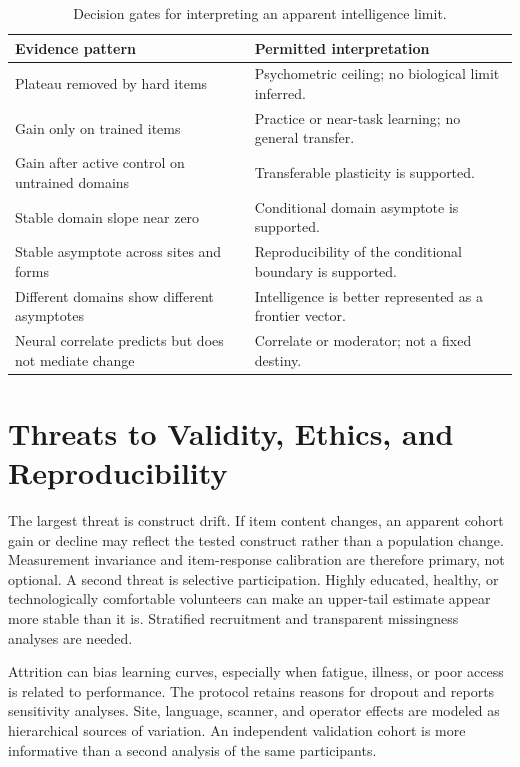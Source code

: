 \documentclass[conference]{IEEEtran}
\begin{document}
\begin{table}[t]
\caption{Decision gates for interpreting an apparent intelligence limit.}
\label{tab:gates}
\centering
\footnotesize
\setlength{\tabcolsep}{2pt}
\begin{tabular}{p{}p{}}
\toprule
Evidence pattern & Permitted interpretation\\
\midrule
Plateau removed by hard items & Psychometric ceiling; no biological limit inferred.\\
Gain only on trained items & Practice or near-task learning; no general transfer.\\
Gain after active control on untrained domains & Transferable plasticity is supported.\\
Stable domain slope near zero & Conditional domain asymptote is supported.\\
Stable asymptote across sites and forms & Reproducibility of the conditional boundary is supported.\\
Different domains show different asymptotes & Intelligence is better represented as a frontier vector.\\
Neural correlate predicts but does not mediate change & Correlate or moderator; not a fixed destiny.\\
\bottomrule
\end{tabular}
\end{table}

\section{Threats to Validity, Ethics, and Reproducibility}
\label{sec:risks}
The largest threat is construct drift. If item content changes, an apparent cohort gain or decline may reflect the tested construct rather than a population change. Measurement invariance and item-response calibration are therefore primary, not optional. A second threat is selective participation. Highly educated, healthy, or technologically comfortable volunteers can make an upper-tail estimate appear more stable than it is. Stratified recruitment and transparent missingness analyses are needed.

Attrition can bias learning curves, especially when fatigue, illness, or poor access is related to performance. The protocol retains reasons for dropout and reports sensitivity analyses. Site, language, scanner, and operator effects are modeled as hierarchical sources of variation. An independent validation cohort is more informative than a second analysis of the same participants.
\end{document}
